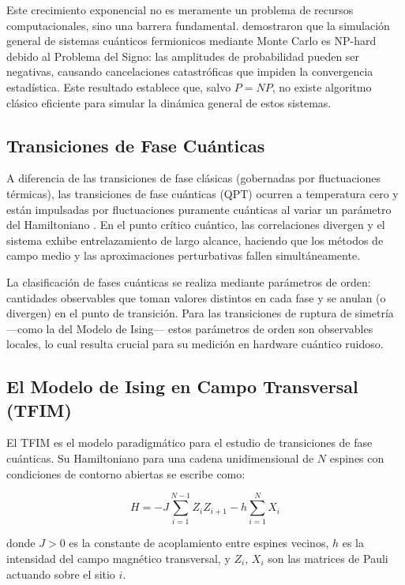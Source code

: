\documentclass[11pt,a4paper,spanish]{book}
\begin{document}
Este crecimiento exponencial no es meramente un problema de recursos computacionales, sino una barrera fundamental. \citet{troyer2005} demostraron que la simulación general de sistemas cuánticos fermionicos mediante Monte Carlo es NP-hard debido al Problema del Signo: las amplitudes de probabilidad pueden ser negativas, causando cancelaciones catastróficas que impiden la convergencia estadística. Este resultado establece que, salvo $P = NP$, no existe algoritmo clásico eficiente para simular la dinámica general de estos sistemas.

\subsection{Transiciones de Fase Cuánticas}

A diferencia de las transiciones de fase clásicas (gobernadas por fluctuaciones térmicas), las transiciones de fase cuánticas (QPT) ocurren a temperatura cero y están impulsadas por fluctuaciones puramente cuánticas al variar un parámetro del Hamiltoniano \citep{dutta2015}. En el punto crítico cuántico, las correlaciones divergen y el sistema exhibe entrelazamiento de largo alcance, haciendo que los métodos de campo medio y las aproximaciones perturbativas fallen simultáneamente.

La clasificación de fases cuánticas se realiza mediante parámetros de orden: cantidades observables que toman valores distintos en cada fase y se anulan (o divergen) en el punto de transición. Para las transiciones de ruptura de simetría ---como la del Modelo de Ising--- estos parámetros de orden son observables locales, lo cual resulta crucial para su medición en hardware cuántico ruidoso.

\subsection{El Modelo de Ising en Campo Transversal (TFIM)}

El TFIM es el modelo paradigmático para el estudio de transiciones de fase cuánticas. Su Hamiltoniano para una cadena unidimensional de $N$ espines con condiciones de contorno abiertas se escribe como:

\begin{equation}
H = -J \sum_{i=1}^{N-1} Z_i Z_{i+1} - h \sum_{i=1}^{N} X_i
\label{eq:tfim}
\end{equation}

\noindent donde $J > 0$ es la constante de acoplamiento entre espines vecinos, $h$ es la intensidad del campo magnético transversal, y $Z_i$, $X_i$ son las matrices de Pauli actuando sobre el sitio $i$.
\end{document}
